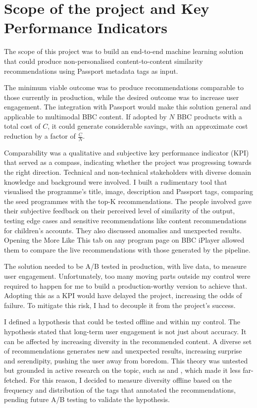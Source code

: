 
\section{Scope of the project and Key Performance Indicators}

The scope of this project was to build an end-to-end machine learning solution that could produce non-personalised
content-to-content similarity recommendations using Passport metadata tags as input.

The minimum viable outcome was to produce recommendations comparable to those currently in production,
while the desired outcome was to increase user engagement.
The integration with Passport would make this solution general and applicable to multimodal BBC content.
If adopted by $N$ BBC products with a total cost of $C$,
it could generate considerable savings, with an approximate cost reduction by a factor of $\frac{C}{N}$.

Comparability was a qualitative and subjective key performance indicator (KPI) that served as a compass,
indicating whether the project was progressing towards the right direction.
Technical and non-technical stakeholders with diverse domain knowledge and background were involved.
I built a rudimentary tool that visualised the programme's title, image, description and Passport tags,
comparing the seed programmes with the top-K recommendations.
The people involved gave their subjective feedback on their perceived level of similarity of the output,
testing edge cases and sensitive recommendations like content recommendations for children's accounts.
They also discussed anomalies and unexpected results.
Opening the More Like This tab on any program page on BBC iPlayer allowed them to compare the live recommendations
with those generated by the pipeline.

The solution needed to be A/B tested in production, with live data, to measure user engagement.
Unfortunately, too many moving parts outside my control were required to happen for me to build a
production-worthy version to achieve that.
Adopting this as a KPI would have delayed the project, increasing the odds of failure.
To mitigate this risk, I had to decouple it from the project's success.

I defined a hypothesis that could be tested offline and within my control.
The hypothesis stated that long-term user engagement is not just about accuracy. It can be affected by increasing diversity in the recommended content.
A diverse set of recommendations generates new and unexpected results, increasing surprise and serendipity, pushing the user away from boredom.
This theory was untested but grounded in active research on the topic, such as \cite{Kaminskas2016DiversitySN} and
\cite{duricic2023beyondaccuracyreviewdiversityserendipity}, which made it less far-fetched.
For this reason, I decided to measure diversity offline based on the frequency and distribution of the tags that annotated the recommendations,
pending future A/B testing to validate the hypothesis.
